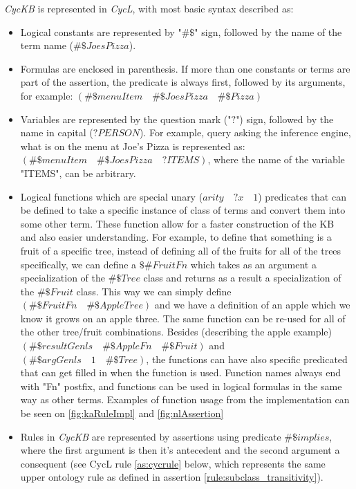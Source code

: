 \emph{CycKB} is represented in \emph{CycL}, with most basic syntax described as:
\begin{itemize}
\item Logical constants are represented by "$\#\$$" sign, followed by the name 
of the term name ($\#\$JoesPizza$).
\item Formulas are enclosed in parenthesis. If more than one constants or terms
are part of the assertion, the predicate is always first, followed by its
arguments, for example: $(\#\$menuItem\quad\#\$JoesPizza\quad\#\$Pizza)$
\item Variables are represented by the question mark ("$?$") sign, followed
by the name in capital ($?PERSON$). For example, query asking the inference
engine, what is on the menu at Joe's Pizza is represented as: 
$(\#\$menuItem\quad\#\$JoesPizza\quad?ITEMS)$, where the name of the variable
"ITEMS", can be arbitrary.
\item Logical functions which are special unary ($arity\quad?x\quad1$) 
predicates that can be defined to take a specific instance of class of terms 
and convert them into some other term. These function allow for a faster 
construction of the KB and also easier understanding. For example, to define
that something is a fruit of a specific tree, instead of defining all of the
fruits for all of the trees specifically, we can define a $\$\#FruitFn$ which 
takes as an argument a specialization of the $\#\$Tree$ class and returns as a 
result a specialization of the $\#\$Fruit$ class. This way we can simply define
$(\#\$FruitFn\quad\#\$AppleTree)$ and we have a definition of an apple which we know
it grows on an apple three. The same function can be re-used for all of the other
tree/fruit combinations. Besides (describing the apple example) 
$(\#\$resultGenls\quad\#\$AppleFn\quad\#\$Fruit)$ and 
$(\#\$argGenls\quad1\quad\#\$Tree)$, the
functions can have also specific predicated that can get filled in when the
function is used. Function names always end with "Fn" postfix, and functions can
be used in logical formulas in the same way as other terms. Examples of function
usage from the implementation can be seen on \autoref{fig:kaRuleImpl} and
\autoref{fig:nlAssertion}
\item Rules in \emph{CycKB} are represented by assertions using predicate 
$\#\$implies$, where the first argument is then it's antecedent and the second
argument a consequent (see CycL rule \ref{as:cycrule} below, which represents
the same upper ontology rule as defined in assertion 
\ref{rule:subclass_transitivity}).
\end{itemize}

